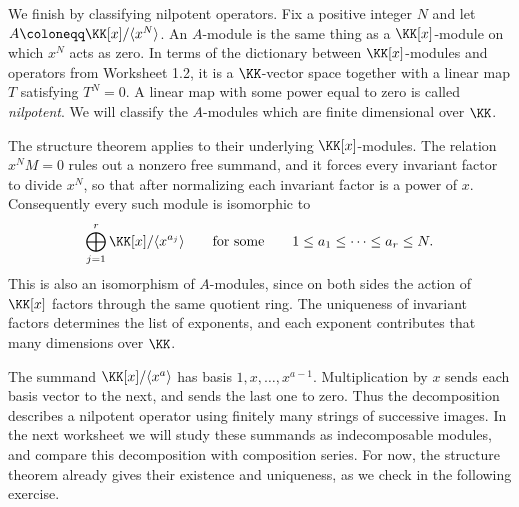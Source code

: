 \documentclass[12pt,reqno]{amsart}
\begin{document}
\hrulefill

We finish by classifying nilpotent operators. Fix a positive integer $N$ and let $A\coloneqq\KK[x]/\langle x^N\rangle$. An $A$-module is the same thing as a $\KK[x]$-module on which $x^N$ acts as zero. In terms of the dictionary between $\KK[x]$-modules and operators from Worksheet 1.2, it is a $\KK$-vector space together with a linear map $T$ satisfying $T^N=0$. A linear map with some power equal to zero is called \emph{nilpotent}. We will classify the $A$-modules which are finite dimensional over $\KK$.

The structure theorem applies to their underlying $\KK[x]$-modules. The relation $x^NM=0$ rules out a nonzero free summand, and it forces every invariant factor to divide $x^N$, so that after normalizing each invariant factor is a power of $x$. Consequently every such module is isomorphic to
\[
\bigoplus_{j=1}^r\KK[x]/\langle x^{a_j}\rangle\qquad\text{for some}\qquad1\leq a_1\leq\cdots\leq a_r\leq N.
\]
This is also an isomorphism of $A$-modules, since on both sides the action of $\KK[x]$ factors through the same quotient ring. The uniqueness of invariant factors determines the list of exponents, and each exponent contributes that many dimensions over $\KK$.

The summand $\KK[x]/\langle x^a\rangle$ has basis $1,x,\ldots,x^{a-1}$. Multiplication by $x$ sends each basis vector to the next, and sends the last one to zero. Thus the decomposition describes a nilpotent operator using finitely many strings of successive images. In the next worksheet we will study these summands as indecomposable modules, and compare this decomposition with composition series. For now, the structure theorem already gives their existence and uniqueness, as we check in the following exercise.

\hrulefill
\end{document}
